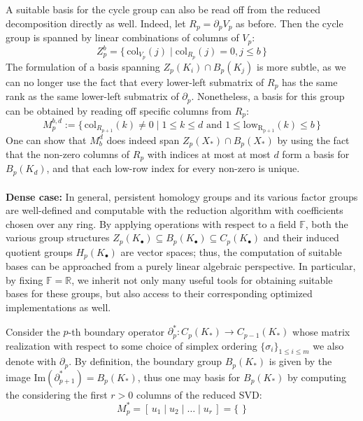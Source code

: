 \documentclass[10pt]{article}
\begin{document}
A suitable basis for the cycle group can also be read off from the reduced decomposition directly as well. Indeed, let $R_p = \partial_p V_p$ as before. Then the cycle group is spanned by linear combinations of columns of $V_p$: 
\begin{equation}
	Z_p^b = \{ \, \mathrm{col}_{V_p}(j) \mid \mathrm{col}_{R_{p}}(j) = 0, j \leq b \, \}	
\end{equation}
The formulation of a basis spanning $Z_p(K_i) \cap B_p(K_j)$ is more subtle, as we can no longer use the  fact that every lower-left submatrix of $R_p$ has the same rank as the same lower-left submatrix of $\partial_p$. 
Nonetheless, a basis for this group can be obtained by reading off specific columns from $R_p$: 
\begin{equation}
	M_p^{b, d} := \{\, \mathrm{col}_{R_{p+1}}(k) \neq 0 \mid 1 \leq k \leq d \text{ and } 1 \leq \mathrm{low}_\mathrm{R_{p+1}}(k) \leq b \, \}
\end{equation}
One can show that $M_b^d$ does indeed span $Z_p(X_\ast) \cap B_p(X_\ast)$ by using the fact that the non-zero columns of $R_p$ with indices at most at most $d$ form a basis for $B_p(K_d)$, and that each low-row index for every non-zero is unique. 
\\
\\
\noindent
\textbf{Dense case:} 
In general, persistent homology groups and its various factor groups are well-defined and computable with the reduction algorithm with coefficients chosen over any ring. By applying operations with respect to a field $\mathbb{F}$, both the various group structures $Z_p(K_\bullet) \subseteq B_p(K_\bullet)  \subseteq C_p(K_\bullet) $ and their induced quotient groups $H_p(K_\bullet)$ are vector spaces; thus, the computation of suitable bases can be approached from a purely linear algebraic perspective.
In particular, by fixing $\mathbb{F} = \mathbb{R}$, we inherit not only many useful tools for obtaining suitable bases for these groups, but also access to their corresponding optimized implementations as well. 

Consider the $p$-th boundary operator $\partial_p^\ast : C_p(K_\ast) \to C_{p-1}(K_\ast)$ whose matrix realization with respect to some choice of simplex ordering $\{\sigma_i\}_{1 \leq i \leq m}$ we also denote with $\partial_p$. By definition, the boundary group $B_p(K_\ast)$ is given by the image $\mathrm{Im}(\partial_{p+1}^\ast) = B_p(K_\ast)$, thus one may basis for $B_p(K_\ast)$ by computing the considering the first $r > 0$  columns of the reduced SVD: 
\begin{equation}
	M_p^\ast = [\, u_1 \mid u_2 \mid \dots \mid u_r \, ] = \{ \,  \, \}
\end{equation}
\end{document}
